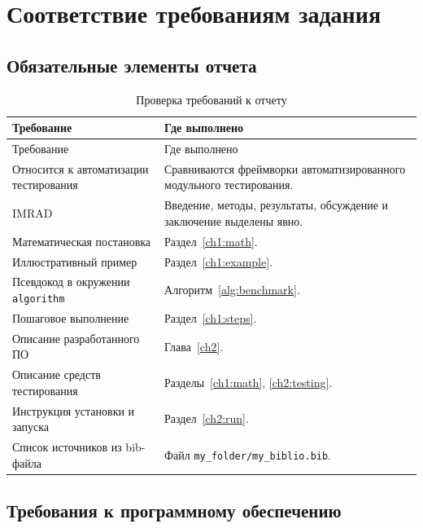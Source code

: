 \chapter{Соответствие требованиям задания} \label{ch5}

\section{Обязательные элементы отчета} \label{ch5:report}

\noindent
\begingroup
\centering
\small
\begin{longtable}[c]{|p{6cm}|p{9cm}|}
    \caption{Проверка требований к отчету}
    \label{tab:report-requirements}
    \\
    \hline
    Требование & Где выполнено \\ \hline
    \endfirsthead
    \hline
    Требование & Где выполнено \\ \hline
    \endhead
    \hline
    Относится к автоматизации тестирования & Сравниваются фреймворки автоматизированного модульного тестирования. \\ \hline
    IMRAD & Введение, методы, результаты, обсуждение и заключение выделены явно. \\ \hline
    Математическая постановка & Раздел~\ref{ch1:math}. \\ \hline
    Иллюстративный пример & Раздел~\ref{ch1:example}. \\ \hline
    Псевдокод в окружении \texttt{algorithm} & Алгоритм~\ref{alg:benchmark}. \\ \hline
    Пошаговое выполнение & Раздел~\ref{ch1:steps}. \\ \hline
    Описание разработанного ПО & Глава~\ref{ch2}. \\ \hline
    Описание средств тестирования & Разделы~\ref{ch1:math}, \ref{ch2:testing}. \\ \hline
    Инструкция установки и запуска & Раздел~\ref{ch2:run}. \\ \hline
    Список источников из bib-файла & Файл \texttt{my\_folder/my\_biblio.bib}. \\ \hline
\end{longtable}
\normalsize
\endgroup

\section{Требования к программному обеспечению} \label{ch5:software}


